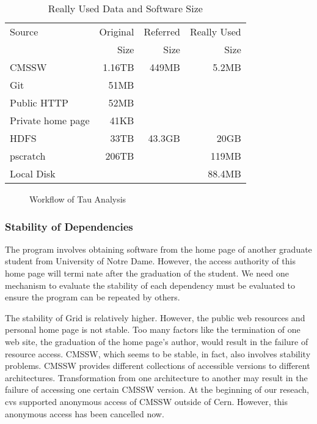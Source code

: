 \documentclass{acm_proc_article-sp}
\begin{document}
\begin{table}
    \centering
    \begin{tabular}{|l|r|r|r|}
        \hline
        Source & Original & Referred & Really Used \\ 
        & Size & Size & Size \\ \hline
        CMSSW & 1.16TB & 449MB & 5.2MB\\ \hline
        Git & 51MB & & \\ \hline
        Public HTTP & 52MB & & \\ \hline
        Private home page & 41KB & & \\ \hline
        HDFS & 33TB & 43.3GB & 20GB \\ \hline
        pscratch & 206TB & & 119MB \\ \hline
        Local Disk & & & 88.4MB \\ \hline     
    \end{tabular}
    \caption{Really Used Data and Software Size}
    \label{table:size-original-real}
\end{table}

\begin{figure}
\centering
{}
\caption{Workflow of Tau Analysis}
\label{fig:data-code-size}
\end{figure}


\subsubsection{Stability of Dependencies}

The program involves obtaining software from the home page of another graduate
student from University of Notre Dame. However, the access authority of this
home page will termi nate after the graduation of the student. We need one
mechanism to 
evaluate the stability of each dependency must be evaluated to ensure the program can be 
repeated by others.

The stability of Grid is relatively higher. However, the
public web resources and personal home page is not stable. Too many factors
like the termination of one web site, the graduation of the home page's author,
would result in the failure of resource access. CMSSW, which seems to be
stable, in fact, also involves stability problems. CMSSW provides different
collections of accessible versions to different architectures. Transformation
from one architecture to another may result in the failure of accessing one
certain CMSSW version. At the beginning of our reseach, cvs supported
anonymous access of CMSSW outside of Cern. However, this anonymous access has
been cancelled now.
\end{document}
